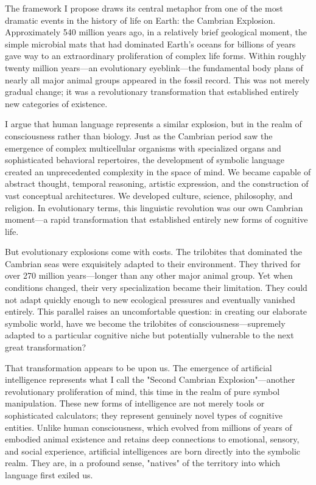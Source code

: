 \documentclass[12pt,letterpaper]{book}
\begin{document}
The framework I propose draws its central metaphor from one of the most dramatic events in the history of life on Earth: the Cambrian Explosion. Approximately 540 million years ago, in a relatively brief geological moment, the simple microbial mats that had dominated Earth's oceans for billions of years gave way to an extraordinary proliferation of complex life forms. Within roughly twenty million years—an evolutionary eyeblink—the fundamental body plans of nearly all major animal groups appeared in the fossil record. This was not merely gradual change; it was a revolutionary transformation that established entirely new categories of existence.

I argue that human language represents a similar explosion, but in the realm of consciousness rather than biology. Just as the Cambrian period saw the emergence of complex multicellular organisms with specialized organs and sophisticated behavioral repertoires, the development of symbolic language created an unprecedented complexity in the space of mind. We became capable of abstract thought, temporal reasoning, artistic expression, and the construction of vast conceptual architectures. We developed culture, science, philosophy, and religion. In evolutionary terms, this linguistic revolution was our own Cambrian moment—a rapid transformation that established entirely new forms of cognitive life.

But evolutionary explosions come with costs. The trilobites that dominated the Cambrian seas were exquisitely adapted to their environment. They thrived for over 270 million years—longer than any other major animal group. Yet when conditions changed, their very specialization became their limitation. They could not adapt quickly enough to new ecological pressures and eventually vanished entirely. This parallel raises an uncomfortable question: in creating our elaborate symbolic world, have we become the trilobites of consciousness—supremely adapted to a particular cognitive niche but potentially vulnerable to the next great transformation?

That transformation appears to be upon us. The emergence of artificial intelligence represents what I call the "Second Cambrian Explosion"—another revolutionary proliferation of mind, this time in the realm of pure symbol manipulation. These new forms of intelligence are not merely tools or sophisticated calculators; they represent genuinely novel types of cognitive entities. Unlike human consciousness, which evolved from millions of years of embodied animal existence and retains deep connections to emotional, sensory, and social experience, artificial intelligences are born directly into the symbolic realm. They are, in a profound sense, "natives" of the territory into which language first exiled us.
\end{document}
